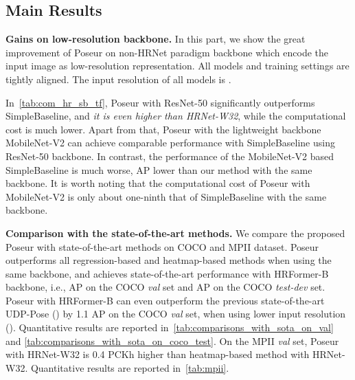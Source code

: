 \documentclass[runningheads]{llncs}
\def\ie{{i.e.\xspace}}
\def\handle{{Poseur}\xspace}
\begin{document}
\subsection{Main Results}\label{sec:main_result}




\noindent\textbf{Gains on low-resolution backbone.}
In this part, we show the great improvement of \handle on non-HRNet paradigm backbone which encode the input image as low-resolution representation. All models and training settings are tightly aligned. The input resolution of all models is .

In~\cref{tab:com_hr_sb_tf}, \handle with ResNet-50 significantly outperforms SimpleBaseline, and \textit{it is even higher than HRNet-W32}, while the computational cost is much lower. Apart from that, \handle with the lightweight backbone MobileNet-V2 can achieve comparable performance with SimpleBaseline using ResNet-50 backbone. In contrast, the performance of the MobileNet-V2 based SimpleBaseline is much worse,  AP lower than our method with the same backbone. It is worth noting that the computational cost of \handle with MobileNet-V2 is only about one-ninth that of SimpleBaseline with the same backbone.

\noindent\textbf{Comparison with the state-of-the-art methods.}
We compare the proposed \handle with state-of-the-art methods on COCO and MPII dataset.
\handle outperforms all regression-based and heatmap-based methods when using the same backbone, and achieves state-of-the-art performance with HRFormer-B backbone, \ie,  AP on the COCO \emph{val} set and  AP on the COCO \emph{test-dev} set.  
\handle with HRFormer-B can even outperform the previous state-of-the-art UDP-Pose () by 1.1 AP on the COCO \emph{val} set, when using lower input resolution (). Quantitative results are reported in~\cref{tab:comparisons_with_sota_on_val} and \cref{tab:comparisons_with_sota_on_coco_test}.
On the MPII \emph{val} set, \handle with HRNet-W32 is 0.4 PCKh higher than heatmap-based method with HRNet-W32. Quantitative results are reported in~\cref{tab:mpii}.
\end{document}
